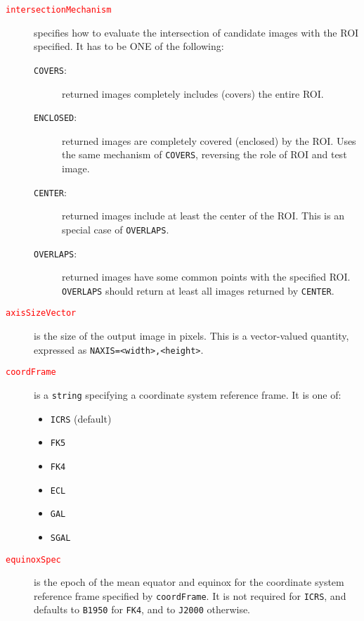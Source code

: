 \begin{description}
		\item[\textcolor{red}{\texttt{intersectionMechanism}}] specifies
        how to evaluate the intersection of candidate images with the
        ROI specified. It has to be ONE of the following:
		
		\begin{description}
			\item[\texttt{COVERS}:] returned images completely 
			includes (covers) the entire ROI.
			
			\item[\texttt{ENCLOSED}:] returned images are completely 
			covered (enclosed) by the ROI. Uses the same mechanism 
			of \texttt{COVERS}, reversing the role of ROI and test 
			image.
			
			\item[\texttt{CENTER}:] returned images include at least 
			the center of the ROI. This is an special case of 
			\texttt{OVERLAPS}.
			
			\item[\texttt{OVERLAPS}:] returned images have some 
			common points with the specified ROI. \texttt{OVERLAPS}
			should return at least all images returned by 
			\texttt{CENTER}.
		\end{description}
		
		\item[\textcolor{red}{\texttt{axisSizeVector}}] is the size of
        the output image in pixels. This is a vector-valued quantity,
        expressed as \texttt{NAXIS}\texttt{=}\texttt{<width>,<height>}.
		
		\item[\textcolor{red}{\texttt{coordFrame}}] is a \texttt{string}
        specifying a coordinate system reference frame. It is one of:
		
		\begin{itemize}
			\item \texttt{ICRS} (default)
			\item \texttt{FK5}
			\item \texttt{FK4}
			\item \texttt{ECL}
			\item \texttt{GAL}
			\item \texttt{SGAL}
		\end{itemize}
		
		\item[\textcolor{red}{\texttt{equinoxSpec}}] is the epoch of the
        mean equator and equinox for the coordinate system reference
        frame specified by \texttt{coordFrame}. It is not required for
        \texttt{ICRS}, and defaults to \texttt{B1950} for \texttt{FK4},
        and to \texttt{J2000} otherwise.
		

\end{description}
